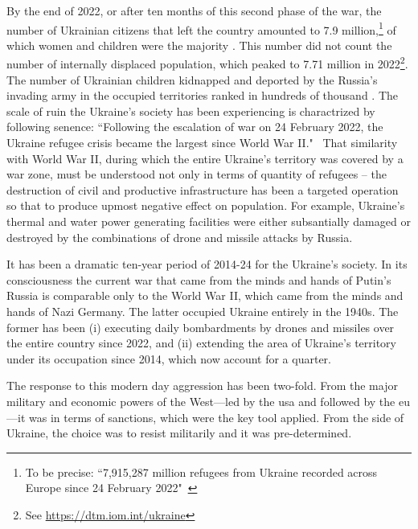 By the end of 2022, or after ten months of this second phase of the war, the number of Ukrainian citizens that left the country amounted to 7.9 million,\footnote{To be precise: ``7,915,287 million refugees from Ukraine recorded across Europe since 24 February 2022"~\citep{unisef2022}} of which women and children were the majority \citep{unisef2022,wb2023}. This number did not count the number of internally displaced population, which peaked to 7.71 million in 2022\footnote{See {\small\url{https://dtm.iom.int/ukraine}}}. The number of Ukrainian children kidnapped and deported by the Russia's invading army in the occupied territories ranked in hundreds of thousand \citep{un2023}. The scale of ruin the Ukraine's society has been experiencing is charactrized by following senence: ``Following the escalation of war on 24 February 2022, the Ukraine refugee crisis became the largest since World War II."~\citep[p.~2]{unisef2022} That similarity with World War II, during which the entire Ukraine's territory was covered by a war zone, must be understood not only in terms of quantity of refugees -- the destruction of civil and productive infrastructure has been a targeted operation so that to produce upmost negative effect on population. For example, Ukraine's thermal and water power generating facilities were either subsantially damaged or destroyed by the combinations of drone and missile attacks by Russia.

It has been a dramatic ten-year period of 2014-24 for the Ukraine's society. In its consciousness the current war that came from the minds and hands of Putin's Russia is comparable only to the World War II, which came from the minds and hands of Nazi Germany. The latter occupied Ukraine entirely in the 1940s. The former has been (i) executing daily bombardments by drones and missiles over the entire country since 2022, and (ii) extending the area of Ukraine's territory under its occupation since 2014, which now account for a quarter. 

The response to this modern day aggression has been two-fold. From the major military and economic powers of the West---led by the \ac{usa} and followed by the \ac{eu}---it was in terms of sanctions, which were the key tool applied. From the side of Ukraine, the choice was to resist militarily and it was pre-determined. 



